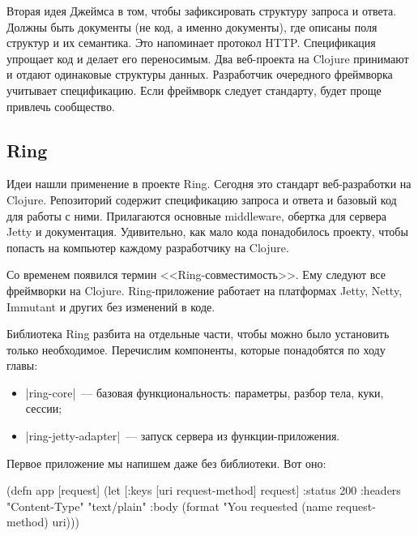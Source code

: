 Вторая идея Джеймса в том, чтобы зафиксировать структуру запроса и
ответа. Должны быть документы (не код, а именно документы), где описаны поля
структур и их семантика. Это напоминает протокол HTTP. Спецификация упрощает код
и делает его переносимым. Два веб-проекта на Clojure принимают и отдают
одинаковые структуры данных. Разработчик очередного фреймворка учитывает
спецификацию. Если фреймворк следует стандарту, будет проще привлечь сообщество.

\subsection{Ring}

\label{ring-jetty}

Идеи нашли применение в проекте
Ring. Сегодня это стандарт
веб-разработки на Clojure. Репозиторий содержит спецификацию запроса и ответа и
базовый код для работы с ними. Прилагаются основные middleware, обертка для
сервера Jetty и документация. Удивительно, как мало кода понадобилось проекту,
чтобы попасть на компьютер каждому разработчику на Clojure.

Со временем появился термин <<Ring-совместимость>>. Ему следуют все фреймворки
на Clojure. Ring-приложение работает на платформах Jetty, Netty, Immutant и
других без изменений в коде.

Библиотека Ring разбита на отдельные части, чтобы можно было установить только
необходимое. Перечислим компоненты, которые понадобятся по ходу главы:

\begin{itemize}

\item
  \spverb|ring-core|~--- базовая функциональность: параметры, разбор тела, куки,
  сессии;

\item
  \spverb|ring-jetty-adapter|~--- запуск сервера из функции-приложения.

\end{itemize}

Первое приложение мы напишем даже без библиотеки. Вот оно:

\label{first-handler}

\begin{english}
  \begin{clojure}
(defn app [request]
  (let [{:keys [uri request-method]} request]
    {:status 200
     :headers {"Content-Type" "text/plain"}
     :body (format "You requested %
                   (name request-method) uri)}))
  \end{clojure}
\end{english}

